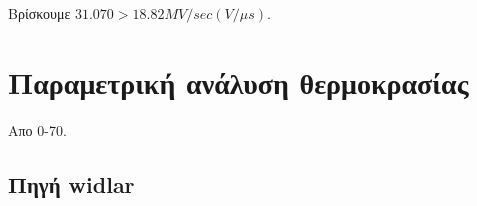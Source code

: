 \documentclass[12pt, a4paper]{article}
\begin{document}
Βρίσκουμε $31.070 > 18.82 MV/sec (V/μs)$. 




\section{Παραμετρική ανάλυση θερμοκρασίας}

Απο 0-70.

\subsection{Πηγή widlar}
\end{document}
